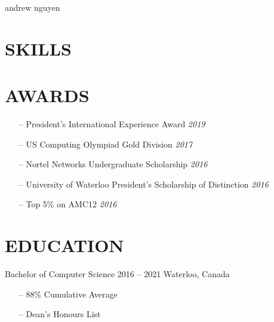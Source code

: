 \documentclass{aanguyen_res}
\begin{document}
  \header%
    {andrew}%
    {nguyen}%
    {}%
    {}%
  \begin{sidebar}
    \section{SKILLS}
    \section{AWARDS}
      \begin{itemize}[leftmargin=0.45cm, topsep=0.0cm]%
        \item[--] President's International Experience Award \separator\emph{2019}
        \item[--] US Computing Olympiad Gold Division \separator\emph{2017}
        \item[--] Nortel Networks Undergraduate Scholarship \separator\emph{2016}
        \item[--] University of Waterloo President's Scholarship of Distinction \separator\emph{2016}
        \item[--] Top 5\% on AMC12  \separator\emph{2016}
      \end{itemize}%
    \section{EDUCATION}
      \color{tagText}Bachelor of Computer Science
      \color{subTagText}2016 -- 2021 \separator\color{subTagText}Waterloo, Canada
      \color{bodyText}%
      \begin{itemize}[leftmargin=0.45cm, noitemsep, topsep=0.0cm]%
        \item[--] 88\% Cumulative Average
        \item[--] Dean's Honours List
      \end{itemize}%

\end{sidebar}
\end{document}
